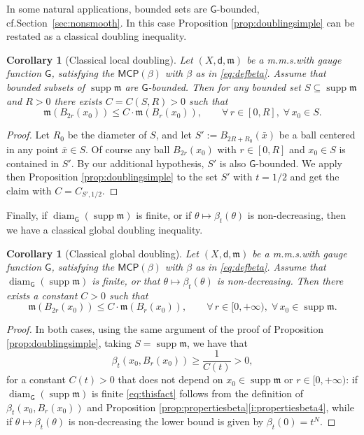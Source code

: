 \documentclass[11pt,a4paper]{article}
\theoremstyle{plain}
\newtheorem{corollary}[theorem]{Corollary}
\theoremstyle{definition}
\theoremstyle{remark}
\numberwithin{equation}{section}
\DeclareMathOperator{\supp}{\mathrm{supp}}
\newcommand{\MCP}{\mathsf{MCP}}
\DeclareMathOperator{\diam}{\mathrm{diam}}
\newcommand{\mm}{\mathfrak m}
\newcommand{\sfd}{\mathsf d}
\newcommand{\sfG}{\mathsf G}
\begin{document}
In some natural applications, bounded sets are $\sfG$-bounded, cf.\@ Section~\ref{sec:nonsmooth}. In this case Proposition \ref{prop:doublingsimple} can be restated as a classical doubling inequality. 

\begin{corollary}[Classical local doubling]\label{cor:localdoubling}
Let $(X,\sfd,\mm)$ be a m.m.s.\@ with gauge function $\sfG$, satisfying the $\MCP(\beta)$ with $\beta$ as in \eqref{eq:defbeta}. Assume that bounded subsets of $\supp\mm$ are $\sfG$-bounded. Then for any bounded set $S\subseteq \supp\mm$ and $R>0$ there exists $C=C(S,R)>0$ such that
\begin{equation}
\mm(B_{2r}(x_0))\leq C \cdot \mm(B_{r}(x_0)),\qquad \forall\, r \in [0,R],\; \forall\, x_0\in S.
\end{equation}
\end{corollary}
\begin{proof}
Let $R_0$ be the diameter of $S$, and let $S':=B_{2R+R_0}(\bar{x})$ be a ball centered in any point $\bar{x}\in S$. Of course any ball $B_{2r}(x_0)$ with $r\in [0,R]$ and $x_0\in S$ is contained in $S'$. By our additional hypothesis, $S'$ is also $\sfG$-bounded. We apply then Proposition \ref{prop:doublingsimple} to the set $S'$  with $t=1/2$ and get the claim with $C=C_{S',1/2}$.
\end{proof}

Finally, if $\diam_\sfG(\supp\mm)$ is finite, or if $\theta\mapsto\beta_t(\theta)$ is non-decreasing, then we have a classical global doubling inequality.

\begin{corollary}[Classical global doubling]\label{cor:classicaldoubling}
Let $(X,\sfd,\mm)$ be a m.m.s.\@ with gauge function $\sfG$, satisfying the $\MCP(\beta)$ with $\beta$ as in \eqref{eq:defbeta}. Assume that $\diam_\sfG(\supp\mm)$ is finite, or that $\theta\mapsto\beta_t(\theta)$ is non-decreasing. Then there exists a constant $C>0$ such that
\begin{equation}
\mm(B_{2r}(x_0))\leq C \cdot \mm(B_{r}(x_0)),\qquad \forall\, r \in [0,+\infty),\; \forall\, x_0\in \supp\mm.
\end{equation}
\end{corollary}
\begin{proof}
In both cases, using the same argument of the proof of Proposition \ref{prop:doublingsimple}, taking $S=\supp\mm$, we have that
\begin{equation}\label{eq:thisfact}
\beta_t(x_0,B_r(x_0)) \geq \frac{1}{C(t)} >0,
\end{equation}
for a constant $C(t)>0$ that does not depend on $x_0\in\supp\mm$ or $r\in [0,+\infty)$: if $\diam_\sfG(\supp\mm)$ is finite \eqref{eq:thisfact} follows from the definition of $\beta_t(x_0,B_r(x_0))$ and Proposition \ref{prop:propertiesbeta}\ref{i:propertiesbeta4}, while if $\theta\mapsto\beta_t(\theta)$ is non-decreasing the lower bound is given by $\beta_t(0)=t^N$.
\end{proof}
\end{document}
